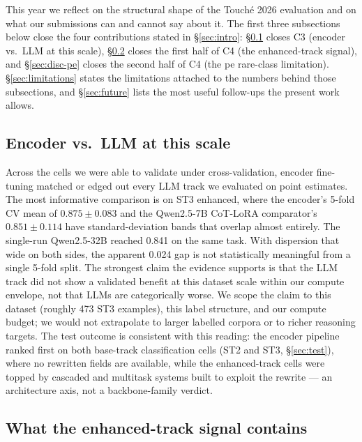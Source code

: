 This year we reflect on the structural shape of the Touch\'{e} 2026 evaluation and on what our submissions can and cannot say about it. The first three subsections below close the four contributions stated in \S\ref{sec:intro}: \S\ref{sec:disc-encoder} closes C3 (encoder vs.\ LLM at this scale), \S\ref{sec:disc-leakage} closes the first half of C4 (the enhanced-track signal), and \S\ref{sec:disc-pe} closes the second half of C4 (the \textsf{pe} rare-class limitation). \S\ref{sec:limitations} states the limitations attached to the numbers behind those subsections, and \S\ref{sec:future} lists the most useful follow-ups the present work allows.

\subsection{Encoder vs.\ LLM at this scale}
\label{sec:disc-encoder}

Across the cells we were able to validate under cross-validation, encoder fine-tuning matched or edged out every LLM track we evaluated on point estimates. The most informative comparison is on ST3 enhanced, where the encoder's 5-fold CV mean of $0.875 \pm 0.083$ and the Qwen2.5-7B CoT-LoRA comparator's $0.851 \pm 0.114$ have standard-deviation bands that overlap almost entirely. The single-run Qwen2.5-32B reached 0.841 on the same task. %
With dispersion that wide on both sides, the apparent 0.024 gap is not statistically meaningful from a single 5-fold split. The strongest claim the evidence supports is that the LLM track did not show a validated benefit at this dataset scale within our compute envelope, not that LLMs are categorically worse. We scope the claim to this dataset (roughly 473 ST3 examples), this label structure, and our compute budget; we would not extrapolate to larger labelled corpora or to richer reasoning targets. The test outcome is consistent with this reading: the encoder pipeline ranked first on both base-track classification cells (ST2 and ST3, \S\ref{sec:test}), where no rewritten fields are available, while the enhanced-track cells were topped by cascaded and multitask systems built to exploit the rewrite --- an architecture axis, not a backbone-family verdict.

\subsection{What the enhanced-track signal contains}
\label{sec:disc-leakage}

